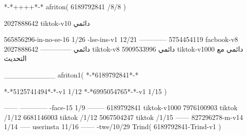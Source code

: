 *-*++++*-*
afriton(
6189792841 /8/8
)

2027888642 tiktok-v10
دائمي

565856296-in-no-se-16 1/26
-lse-ins-v1 12/21
------------
5754454119 facbook-v8
دائمي
--------------
2027888642 tiktok-v8
دائمي
5909533996 tiktok-v1000
دائمي مع التحديث

__________
afriton1(
*-*6189792841*-*


*-*5125741494*-*-v1 1/12
*-*6995054765*-*-v1 1/15
)

------
------------
-face-15 1/9
--------
6189792841 tiktok-v1000
7976100903 tiktok /1/12
6681146003 tiktok /1/12
5067504247 tiktok /1/15
------
827296278-m-v14 1/14
-----
userinsta 11/16
------
-twe/10/29
Trind(
6189792841-Trind-v1 
)
